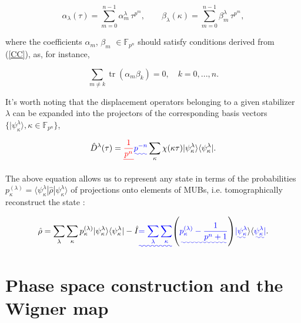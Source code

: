 \documentclass[quantumrep,article,submit,pdftex,moreauthors]{Definitions/mdpi}
\DeclareMathOperator{\tr}{tr}
\providecommand{\DIFadd}[1]{{\protect\color{blue}\uwave{#1}}} %
\providecommand{\DIFdel}[1]{{\protect\color{red}\sout{#1}}}                      %
\providecommand{\DIFaddbegin}{} %
\providecommand{\DIFaddend}{} %
\providecommand{\DIFdelbegin}{} %
\providecommand{\DIFdelend}{} %
\begin{document}
\begin{equation}
  \alpha_{\lambda }(\tau)
  = \sum_{m=0}^{n-1} \alpha_{m}^{\lambda } \, \tau^{p^{m}},
  \qquad \beta_{\lambda}(\kappa)
  = \sum_{m=0}^{n-1}\beta_{m}^{\lambda} \, \tau^{p^{m}},
  \label{curve1}
\end{equation}

where the coefficients $\alpha_{m}$, $\beta_{m}$ $\in \mathbb{F}_{p^{n}}$
should satisfy conditions derived from (\ref{CC}), as, for instance,

\begin{equation*}
  \sum_{m \neq k} \tr(\alpha_{m}\beta_{k}) = 0, \quad k = 0,...,n.
\end{equation*}

It's worth noting that the displacement operators belonging to a given
stabilizer $\lambda$ can be expanded into the projectors of the corresponding
basis vectors $\{|\psi_{\kappa}^{\lambda}\rangle,\kappa \in
\mathbb{F}_{p^{n}}\}$,

\begin{equation}
  \hat{D}^{\lambda }(\tau )
  = \DIFdelbegin \DIFdel{\frac{1}{p^{n}} }\DIFdelend \DIFaddbegin \DIFadd{p^{-n} }\DIFaddend \sum_{\kappa }\chi(\kappa\tau)
  |\psi_{\kappa }^{\lambda } \rangle \langle \psi_{\kappa }^{\lambda }|.
  \label{Dexp}
\end{equation}

The above equation allows us to represent any state in terms of the
probabilities $p_{\kappa}^{(\lambda)} = \langle
\psi_{\kappa}^{\lambda}|\hat{\rho}|\psi_{\kappa}^{\lambda}\rangle$ of
projections onto elements of MUBs, i.e. tomographically reconstruct the state
\cite{gibbons,galvao,cormick,ivanovic,DFW11,DFW12,Durt2006}:

\begin{equation}
  \hat{\rho}
  = \sum_{\lambda}\sum_{\kappa}
  p_{\kappa}^{(\lambda)} |\psi_{\kappa}^{\lambda}\rangle
  \langle \psi_{\kappa}^{\lambda}| - \hat{I}
  \DIFaddbegin \DIFadd{= \sum_{\lambda }\sum_{\kappa}}\left(
    \DIFadd{p_{\kappa }^{(\lambda)}-\frac{1}{p^{n}+1}
  }\right)
  \DIFadd{|\psi_{\kappa}^{\lambda }}\rangle \langle \DIFadd{\psi_{\kappa}^{\lambda}|}\DIFaddend .
  \label{tom r}
\end{equation}


\DIFaddbegin 

\DIFaddend \section{Phase space construction and the Wigner map}
\end{document}
